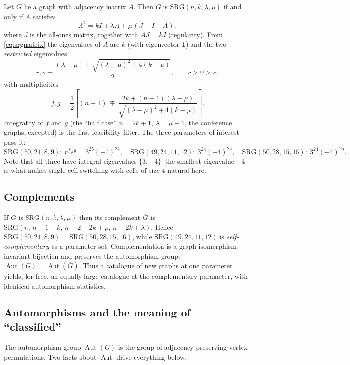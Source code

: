 \documentclass[11pt]{article}
\theoremstyle{definition}
\newcommand{\SRG}[1]{\mathrm{SRG}(#1)}
\newcommand{\Aut}{\operatorname{Aut}}
\begin{document}
Let $G$ be a graph with adjacency matrix $A$. Then $G$ is $\SRG{n,k,\lambda,\mu}$ if and
only if $A$ satisfies
\begin{equation}\label{eq:srgmatrix}
  A^2 = kI + \lambda A + \mu\,(J - I - A),
\end{equation}
where $J$ is the all-ones matrix, together with $AJ = kJ$ (regularity). From
\eqref{eq:srgmatrix} the eigenvalues of $A$ are $k$ (with eigenvector $\mathbf 1$) and
the two \emph{restricted} eigenvalues
\begin{equation}\label{eq:eigs}
  r,s = \frac{(\lambda-\mu)\pm\sqrt{(\lambda-\mu)^2 + 4(k-\mu)}}{2},
  \qquad r > 0 > s,
\end{equation}
with multiplicities
\begin{equation}\label{eq:mult}
  f,g = \frac12\!\left[(n-1)\ \mp\
  \frac{2k+(n-1)(\lambda-\mu)}{\sqrt{(\lambda-\mu)^2+4(k-\mu)}}\right].
\end{equation}
Integrality of $f$ and $g$ (the ``half case'' $n=2k+1$, $\lambda=\mu-1$, the conference
graphs, excepted) is the first feasibility filter. The three parameters of interest pass
it:
\[
  \SRG{50,21,8,9}:\ r^f s^g = 3^{25}(-4)^{24},\quad
  \SRG{49,24,11,12}:\ 3^{24}(-4)^{24},\quad
  \SRG{50,28,15,16}:\ 3^{24}(-4)^{25}.
\]
Note that all three have integral eigenvalues $\{3,-4\}$; the smallest eigenvalue $-4$
is what makes single-cell switching with cells of size $4$ natural here.

\subsection{Complements}

If $G$ is $\SRG{n,k,\lambda,\mu}$ then its complement $\overline G$ is
$\SRG{n,\,n-1-k,\,n-2-2k+\mu,\,n-2k+\lambda}$. Hence
$\overline{\SRG{50,21,8,9}}=\SRG{50,28,15,16}$, while $\SRG{49,24,11,12}$ is
\emph{self-complementary} as a parameter set. Complementation is a graph isomorphism
invariant bijection and preserves the automorphism group:
$\Aut(G)=\Aut(\overline G)$. Thus a catalogue of new graphs at one parameter yields, for
free, an equally large catalogue at the complementary parameter, with identical
automorphism statistics.

\subsection{Automorphisms and the meaning of ``classified''}\label{sec:classified}

The automorphism group $\Aut(G)$ is the group of adjacency-preserving vertex
permutations. Two facts about $\Aut$ drive everything below.
\end{document}

